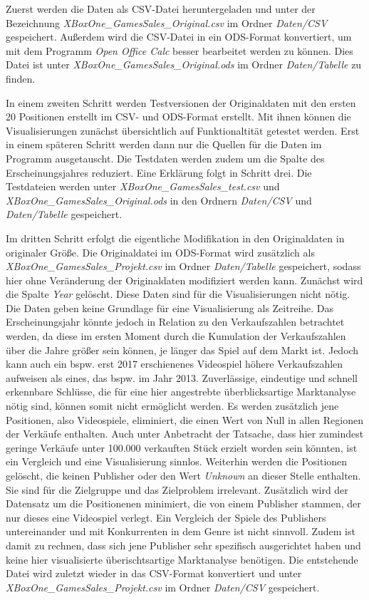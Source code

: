 \documentclass[usegeometry=true]{scrartcl}
\begin{document}
Zuerst werden die Daten als CSV-Datei heruntergeladen und unter der Bezeichnung \textit{XBoxOne_GamesSales_Original.csv} im Ordner \textit{Daten/CSV} gespeichert. 
Außerdem wird die CSV-Datei in ein ODS-Format konvertiert, um mit dem Programm \textit{Open Office Calc} besser bearbeitet werden zu können. 
Dies Datei ist unter \textit{XBoxOne_GamesSales_Original.ods} im Ordner \textit{Daten/Tabelle} zu finden. 

In einem zweiten Schritt werden Testversionen der Originaldaten mit den ersten 20 Positionen erstellt im CSV- und ODS-Format erstellt. 
Mit ihnen können die Visualisierungen zunächst übersichtlich auf Funktionaltität getestet werden. 
Erst in einem späteren Schritt werden dann nur die Quellen für die Daten im Programm ausgetauscht. 
Die Testdaten werden zudem um die Spalte des Erscheinungsjahres reduziert. Eine Erklärung folgt in Schritt drei.
Die Testdateien werden unter \textit{XBoxOne_GamesSales_test.csv} und \textit{XBoxOne_GamesSales_Original.ods} in den Ordnern \textit{Daten/CSV} und \textit{Daten/Tabelle} gespeichert.

Im dritten Schritt erfolgt die eigentliche Modifikation in den Originaldaten in originaler Größe. 
Die Originaldatei im ODS-Format wird zusätzlich als \textit{XBoxOne_GamesSales_Projekt.csv} im Ordner \textit{Daten/Tabelle} gespeichert, sodass hier ohne Veränderung der Originaldaten modifiziert werden kann.
Zunächst wird die Spalte  \textit{Year} gelöscht. Diese Daten sind für die Visualisierungen nicht nötig. 
Die Daten geben keine Grundlage für eine Visualisierung als Zeitreihe. 
Das Erscheinungsjahr könnte jedoch in Relation zu den Verkaufszahlen betrachtet werden, da diese im ersten Moment durch die Kumulation der Verkaufszahlen über die Jahre größer sein können, je länger das Spiel auf dem Markt ist. 
Jedoch kann auch ein bspw. erst 2017 erschienenes Videospiel höhere Verkaufszahlen aufweisen als eines, das bspw. im Jahr 2013. 
Zuverlässige, eindeutige und schnell erkennbare Schlüsse, die für eine hier angestrebte überblicksartige Marktanalyse nötig sind, können somit nicht ermöglicht werden. 
Es werden zusätzlich jene Positionen, also Videospiele, eliminiert, die einen Wert von Null in allen Regionen der Verkäufe enthalten. 
Auch unter Anbetracht der Tatsache, dass hier zumindest geringe Verkäufe unter 100.000 verkauften Stück erzielt worden sein könnten, ist ein Vergleich und eine Visualisierung sinnlos.
Weiterhin werden die Positionen gelöscht, die keinen Publisher oder den Wert  \textit{Unknown} an dieser Stelle enthalten. Sie sind für die Zielgruppe und das Zielproblem irrelevant.
Zusätzlich wird der Datensatz um die Positionenen minimiert, die von einem Publisher stammen, der nur dieses eine Videospiel verlegt. 
Ein Vergleich der Spiele des Publishers untereinander und mit Konkurrenten in dem Genre ist nicht sinnvoll. 
Zudem ist damit zu rechnen, dass sich jene Publisher sehr spezifisch ausgerichtet haben und keine hier visualisierte überischtsartige Marktanalyse benötigen.
Die entstehende Datei wird zuletzt wieder in das CSV-Format konvertiert und unter \textit{XBoxOne_GamesSales_Projekt.csv} im Ordner \textit{Daten/CSV} gespeichert.
\end{document}
